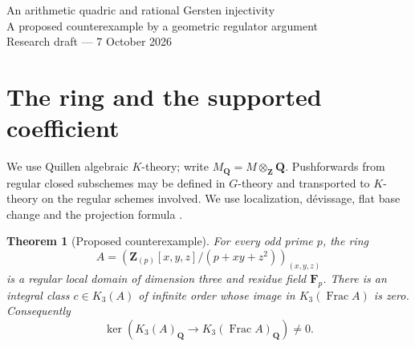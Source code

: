 \documentclass[11pt,a4paper]{article}
\newtheorem{theorem}{Theorem}[section]
\theoremstyle{remark}
\newcommand{\Z}{\mathbf Z}
\newcommand{\Q}{\mathbf Q}
\newcommand{\F}{\mathbf F}
\newcommand{\Frac}{\operatorname{Frac}}
\begin{document}
\thispagestyle{plain}
\begin{center}
{\Large An arithmetic quadric and rational Gersten injectivity}\\[4pt]
{\normalsize A proposed counterexample by a geometric regulator argument}\\[8pt]
{\small Research draft --- 7 October 2026}
\end{center}
\vspace{3pt}
\noindent{}

\begin{abstract}
For an odd prime \(p\), consider the regular local ring
\(\bigl(\Z_{(p)}[x,y,z]/(p+xy+z^2)\bigr)_{(x,y,z)}\).
A Borel coefficient on its regular divisor \(x=0\) gives an actual
supported \(K_3\)-class. After a ramified quadratic base change, this
class becomes a coefficient times a ruling of a split affine quadric.
A small resolution proves that the ruling persists arithmetically.
A componentwise Galois argument then shows that its degree-two Betti
class survives every permitted finite localization. The multiplicative
analytic Deligne regulator detects the resulting class at every such
stage. The proposed conclusion is an infinite-order integral class
with zero generic image.
\end{abstract}

\section{The ring and the supported coefficient}

We use Quillen algebraic \(K\)-theory; write \(M_{\Q}=M\otimes_{\Z}\Q\).
Pushforwards from regular closed subschemes may be defined in
\(G\)-theory and transported to \(K\)-theory on the regular schemes
involved. We use localization, d\'evissage, flat base change and the
projection formula \cite{Quillen}.

\begin{theorem}[Proposed counterexample]\label{thm:geometricmain}
For every odd prime \(p\), the ring
\[
 A=\left(\Z_{(p)}[x,y,z]/(p+xy+z^2)\right)_{(x,y,z)}
\]
is a regular local domain of dimension three and residue field \(\F_p\).
There is an integral class \(c\in K_3(A)\) of infinite order whose
image in \(K_3(\Frac A)\) is zero. Consequently
\[
 \ker\!\left(K_3(A)_{\Q}\longrightarrow K_3(\Frac A)_{\Q}\right)\ne0.
\]
\end{theorem}
\end{document}
